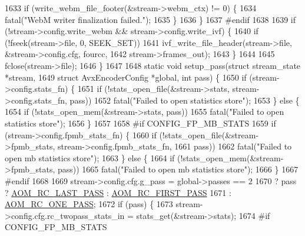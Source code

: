 \begin{DoxyCodeInclude}
{{{{{{{{{{{{{{{{{{{{{{{{{{{{{{1633     \textcolor{keywordflow}{if} (write\_webm\_file\_footer(&stream->webm\_ctx) != 0) \{
1634       fatal(\textcolor{stringliteral}{"WebM writer finalization failed."});
1635     \}
1636   \}
1637 \textcolor{preprocessor}{#endif}
1638 
1639   \textcolor{keywordflow}{if} (!stream->config.write\_webm && stream->config.write\_ivf) \{
1640     \textcolor{keywordflow}{if} (!fseek(stream->file, 0, SEEK\_SET))
1641       ivf\_write\_file\_header(stream->file, &stream->config.cfg, fourcc,
1642                             stream->frames\_out);
1643   \}
1644 
1645   fclose(stream->file);
1646 \}
1647 
1648 \textcolor{keyword}{static} \textcolor{keywordtype}{void} setup\_pass(\textcolor{keyword}{struct} stream\_state *stream,
1649                        \textcolor{keyword}{struct} AvxEncoderConfig *global, \textcolor{keywordtype}{int} pass) \{
1650   \textcolor{keywordflow}{if} (stream->config.stats\_fn) \{
1651     \textcolor{keywordflow}{if} (!stats\_open\_file(&stream->stats, stream->config.stats\_fn, pass))
1652       fatal(\textcolor{stringliteral}{"Failed to open statistics store"});
1653   \} \textcolor{keywordflow}{else} \{
1654     \textcolor{keywordflow}{if} (!stats\_open\_mem(&stream->stats, pass))
1655       fatal(\textcolor{stringliteral}{"Failed to open statistics store"});
1656   \}
1657 
1658 \textcolor{preprocessor}{#if CONFIG\_FP\_MB\_STATS}
1659   \textcolor{keywordflow}{if} (stream->config.fpmb\_stats\_fn) \{
1660     \textcolor{keywordflow}{if} (!stats\_open\_file(&stream->fpmb\_stats, stream->config.fpmb\_stats\_fn,
1661                          pass))
1662       fatal(\textcolor{stringliteral}{"Failed to open mb statistics store"});
1663   \} \textcolor{keywordflow}{else} \{
1664     \textcolor{keywordflow}{if} (!stats\_open\_mem(&stream->fpmb\_stats, pass))
1665       fatal(\textcolor{stringliteral}{"Failed to open mb statistics store"});
1666   \}
1667 \textcolor{preprocessor}{#endif}
1668 
1669   stream->config.cfg.g\_pass = global->passes == 2
1670                                   ? pass ? \hyperlink{group__encoder_gga92b6709b58dc3435e3ba652da562eda1a621c3f07937527618dc06e962425f6cc}{AOM\_RC\_LAST\_PASS} : 
      \hyperlink{group__encoder_gga92b6709b58dc3435e3ba652da562eda1ad342b33a290482c20238bfde5d9bea1e}{AOM\_RC\_FIRST\_PASS}
1671                                   : \hyperlink{group__encoder_gga92b6709b58dc3435e3ba652da562eda1a1b4b8ee9c1910fc59ac9dfd9700f3f02}{AOM\_RC\_ONE\_PASS};
1672   \textcolor{keywordflow}{if} (pass) \{
1673     stream->config.cfg.rc\_twopass\_stats\_in = stats\_get(&stream->stats);
1674 \textcolor{preprocessor}{#if CONFIG\_FP\_MB\_STATS}
}}}}}}}}}}}}}}}}}}}}}}}}}}}}}}
\end{DoxyCodeInclude}
